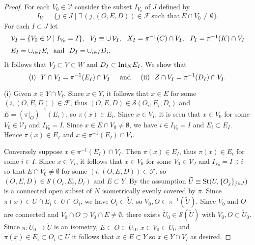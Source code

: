 \documentclass[11pt, fleqn]{amsart}
\theoremstyle{definition}
\newcommand{\cal}{\mathcal}
\begin{document}
\begin{proof} 
For each $V_0 \in {\cal V}$
consider the subset $I_{V_0}$ of $J$ defined by 
$$I_{V_0} = \{ j \in J \mid \exists \, (j, (O, E, D)) \in {\cal F} \ \text{such that} \ E \cap V_0 \neq \emptyset \}.$$ 
For each $I \subset J$ let 
$$\begin{array}[t]{l}
{\cal V}_I = \{ V_0 \in {\cal V} \mid I_{V_0} = I \}, \ \ 
V_I \equiv \cup \,{\cal V}_I, \ \ X_I = \pi^{-1}(C) \cap V_I, \ \ P_I = \pi^{-1}(K) \cap V_I \\[2mm]  
E_I = \cup_{i \in I} E_i \ \ \text{and} \ \ D_I = \cup_{i \in I} D_i.
\end{array}$$ 
\vskip 1mm 
\noindent It follows that $V_I \subset V \subset W$ and $D_I \subset {\rm Int}_N E_I$. 
We show that 
$${\rm (i)} \ \ Y \cap V_I = \pi^{-1}(E_I) \cap V_I \hspace{5mm} \text{and} \hspace{5mm} {\rm (ii)} \ \ Z \cap V_I = \pi^{-1}(D_I) \cap V_I.$$

(i) Given $x \in Y \cap V_I$. 
Since $x \in Y$, it follows that 
$x \in E$ for some $(i, (O,E,D)) \in {\cal F}$, thus $(O,E,D) \in {\cal S}(O_i,E_i,D_i)$ and $E = (\pi|_O)^{-1}(E_i)$, so 
$\pi(x) \in E_i$. 
Since $x \in V_I$, it is seen that $x \in V_0$ for some $V_0 \in {\cal V}_I$ and $I_{V_0} = I$. 
Since $x \in E \cap V_0 \neq \emptyset$, we have $i \in I_{V_0} = I$ and $E_i \subset E_I$. 
Hence $\pi(x) \in E_I$ and $x \in \pi^{-1}(E_I) \cap V_I$. 

Conversely suppose $x \in \pi^{-1}(E_I) \cap V_I$. 
Then $\pi(x) \in E_I$, thus $\pi(x) \in E_i$ for some $i \in I$. 
Since $x \in V_I$, it follows that $x \in V_0$ for some $V_0 \in {\cal V}_I$ and $I_{V_0} = I \ni i$ so that 
$E \cap V_0 \neq \emptyset$ for some $(i, (O,E,D)) \in {\cal F}$, so $(O,E,D) \in {\cal S}(O_i,E_i,D_i)$ and $E \subset Y$.  
By the assumption $\widetilde{U} \equiv {\rm St}(U, \{ O_j \}_{j \in J})$ is a connected open subset of $N$ isometrically evenly covered by $\pi$. 
Since $\pi(x) \in U \cap E_i \subset U \cap O_i$, we have $O_i \subset \widetilde{U}$, so $V_0, O \subset \pi^{-1}(\widetilde{U})$. 
Since $V_0$ and $O$ are connected and  $V_0 \cap O \supset V_0 \cap E \neq \emptyset$, 
there exists $\widetilde{U}_0 \in {\cal S}(\widetilde{U})$ with $V_0, O \subset \widetilde{U}_0$.
Since $\pi : \widetilde{U}_0 \to \widetilde{U}$ is an isometry, 
$E \subset O \subset \widetilde{U}_0$, $x \in V_0 \subset \widetilde{U}_0$ and 
$\pi(x) \in E_i \subset O_i \subset \widetilde{U}$ 
it follows that $x \in E \subset Y$ so $x \in Y \cap V_I$ as desired. 


\end{proof}
\end{document}
